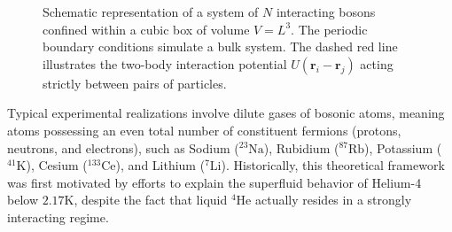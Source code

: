 \begin{figure}[H]
    \centering
    \begin{minipage}{0.55\textwidth}
        \centering
    \end{minipage}\hfill
    \begin{minipage}{0.4\textwidth}
        \caption{Schematic representation of a system of $N$ interacting bosons confined within a cubic box of volume $V=L^3$. The periodic boundary conditions simulate a bulk system. The dashed red line illustrates the two-body interaction potential $U(\mathbf{r}_i - \mathbf{r}_j)$ acting strictly between pairs of particles.}
        \label{fig:bose_gas_box}
    \end{minipage}
\end{figure}

Typical experimental realizations involve dilute gases of bosonic atoms, meaning atoms possessing an even total number of constituent fermions (protons, neutrons, and electrons), such as Sodium (\( ^{23}\text{Na} \)), Rubidium (\( ^{87}\text{Rb} \)), Potassium (\( ^{41}\text{K} \)), Cesium (\( ^{133}\text{Ce} \)), and Lithium (\( ^{7}\text{Li} \)). Historically, this theoretical framework was first motivated by efforts to explain the superfluid behavior of Helium-4 below \( 2.17\text{K} \), despite the fact that liquid \( ^{4}\text{He} \) actually resides in a strongly interacting regime.

